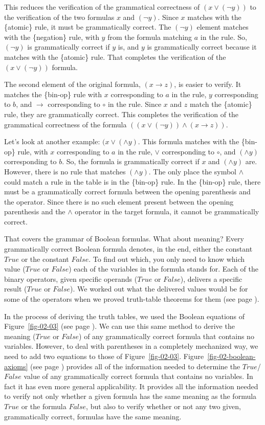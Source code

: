 This reduces the verification of the grammatical correctness of $(x \vee (\neg y))$ to the verification of the two formulas $x$ and $(\neg y)$. Since $x$ matches with the \{atomic\} rule, it must be grammatically correct. The $(\neg y)$ element matches with the \{negation\} rule, with $y$ from the formula matching $a$ in the rule. So, $(\neg y)$ is grammatically correct if $y$ is, and $y$ is grammatically correct because it matches with the \{atomic\} rule. That completes the verification of the $(x \vee (\neg y))$ formula.

The second element of the original formula, $(x \rightarrow z)$, is easier to verify. It matches the \{bin-op\} rule with $x$ corresponding to $a$ in the rule, $y$ corresponding to $b$, and $\rightarrow$ corresponding to $\circ$ in the rule. Since $x$ and $z$ match the \{atomic\} rule, they are grammatically correct. This completes the verification of the grammatical correctness of the formula $((x \vee (\neg y)) \wedge (x \rightarrow z))$.

Let's look at another example: $(x \vee (\wedge y)$. This formula matches with the \{bin-op\} rule, with $x$ corresponding to $a$ in the rule, $\vee$ corresponding to $\circ$, and $(\wedge y)$ corresponding to $b$. So, the formula is grammatically correct if $x$ and $(\wedge y)$ are. However, there is no rule that matches $(\wedge y)$. The only place the symbol $\wedge$ could match a rule in the table is in the \{bin-op\} rule. In the \{bin-op\} rule, there must be a grammatically correct formula between the opening parenthesis and the operator. Since there is no such element present between the opening parenthesis and the $\wedge$ operator in the target formula, it cannot be grammatically correct.

That covers the grammar of Boolean formulas. What about meaning? Every grammatically correct Boolean formula denotes, in the end, either the constant $True$ or the constant $False$. To find out which, you only need to know which value ($True$ or $False$) each of the variables in the formula stands for. Each of the binary operators, given specific operands ($True$ or $False$), delivers a specific result ($True$ or $False$). We worked out what the delivered values would be for some of the operators when we proved truth-table theorems for them (see page \pageref{or-truth-table}).

In the process of deriving the truth tables,
we used the Boolean equations of Figure~\ref{fig-02-03} (see page \pageref{fig-02-03}).
We can use this same method to derive the meaning ($True$ or $False$) of any grammatically correct formula that contains no variables. However, to deal with parentheses in a completely mechanized way, we need to add two equations to those of Figure~\ref{fig-02-03}. Figure~\ref{fig-02-boolean-axioms} (see page \pageref{fig-02-boolean-axioms})
provides all of the information needed to determine the $True$/$False$ value of any grammatically correct formula that contains no variables. In fact it has even more general applicability. It provides all the information needed to verify not only whether a given formula has the same meaning as the formula $True$ or the formula $False$, but also to verify whether or not any two given, grammatically correct, formulas have the same meaning.


